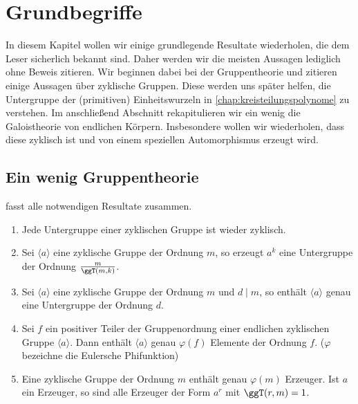\chapter{Grundbegriffe}
\label{chap:grundbegriffe}

In diesem Kapitel wollen wir einige grundlegende Resultate wiederholen, die
dem Leser sicherlich bekannt sind. Daher werden wir die meisten Aussagen 
lediglich ohne Beweis zitieren. Wir beginnen dabei bei der Gruppentheorie und
zitieren einige Aussagen über zyklische Gruppen. Diese werden uns später
helfen, die Untergruppe der (primitiven) Einheitswurzeln
in \autoref{chap:kreisteilungspolynome} zu verstehen. Im anschließend Abschnitt
rekapitulieren wir ein wenig die Galoistheorie von endlichen Körpern.
Insbesondere wollen wir wiederholen, dass diese zyklisch ist und von einem
speziellen Automorphismus erzeugt wird.

\section{Ein wenig Gruppentheorie}


\autocite[Theorem 1.15]{lidl1997finite} fasst alle notwendigen Resultate
zusammen.

\begin{satz}
  \label{satz:zykl_gruppen}
  \begin{enumerate}
    \item Jede Untergruppe einer zyklischen Gruppe ist wieder zyklisch.
    \item Sei $\langle a \rangle$ eine zyklische Gruppe der Ordnung $m$,
      so erzeugt $a^k$ eine Untergruppe der Ordnung $\frac{m}{\ggT(m,k)}$.
    \item Sei $\langle a\rangle$ eine zyklische Gruppe der Ordnung $m$ und
      $d \mid m$, so enthält $\langle a \rangle$ genau eine Untergruppe der
      Ordnung $d$.
     \item Sei $f$ ein positiver Teiler der Gruppenordnung einer endlichen
        zyklischen Gruppe $\langle a \rangle$. Dann enthält $\langle a \rangle$
        genau $\varphi(f)$ Elemente der Ordnung $f$.
        ($\varphi$ bezeichne die Eulersche Phifunktion)
     \item Eine zyklische Gruppe der Ordnung $m$ enthält genau $\varphi(m)$
        Erzeuger. Ist $a$ ein Erzeuger, so sind alle Erzeuger der Form
        $a^r$ mit $\ggT(r,m) = 1$.
  \end{enumerate}
\end{satz}


